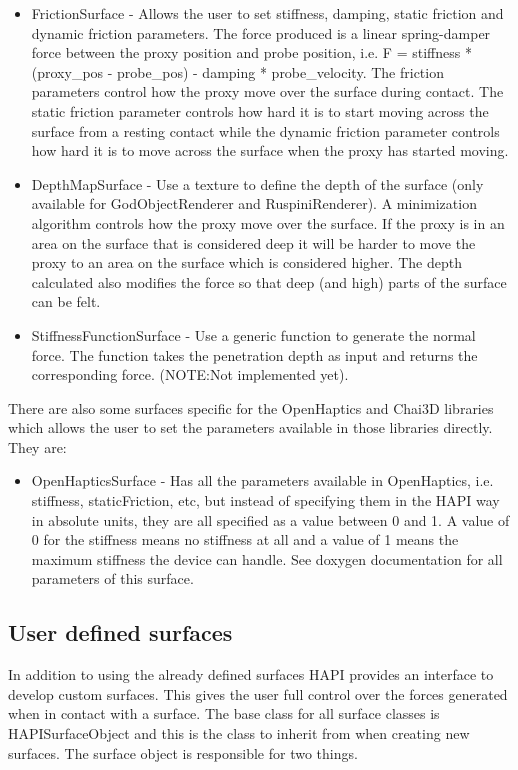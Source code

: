 \begin{itemize}
\item FrictionSurface - Allows the user to set stiffness, damping, static friction and dynamic friction parameters. The force produced is a linear spring-damper force between the proxy position and probe position, i.e. F = stiffness * (proxy\_pos - probe\_pos) - damping * probe\_velocity. The friction parameters control how the proxy move over the surface during contact. The static friction parameter controls how hard it is to start moving across the surface from a resting contact while the dynamic friction parameter controls how hard it is to move across the surface when the proxy has started moving.
\item DepthMapSurface - Use a texture to define the depth of the surface (only available for GodObjectRenderer and RuspiniRenderer). A minimization algorithm controls how the proxy move over the surface. If the proxy is in an area on the surface that is considered deep it will be harder to move the proxy to an area on the surface which is considered higher. The depth calculated also modifies the force so that deep (and high) parts of the surface can be felt.
\item StiffnessFunctionSurface - Use a generic function to generate
  the normal force. The function takes the penetration depth as input
  and returns the corresponding force. (NOTE:Not implemented yet). 
\end{itemize}

There are also some surfaces specific for the OpenHaptics and Chai3D
libraries which allows the user to set the parameters available in
those libraries directly. They are:
\begin{itemize}
\item OpenHapticsSurface - Has all the parameters available in
  OpenHaptics, i.e. stiffness, staticFriction, etc, but instead of
  specifying them in the HAPI way in absolute units, they are all
  specified as a value between 0 and 1. A value of 0 for the stiffness
  means no stiffness at all and a value of 1 means the maximum
  stiffness the device can handle. See doxygen documentation for all
  parameters of this surface.
\end{itemize}

\subsection{User defined surfaces}
In addition to using the already defined surfaces HAPI provides an interface to develop custom surfaces. This gives the user full control over the forces generated when in contact with a surface. The base class for all surface classes is HAPISurfaceObject and this is the class to inherit from when creating new surfaces. The surface object is responsible for two things. 


